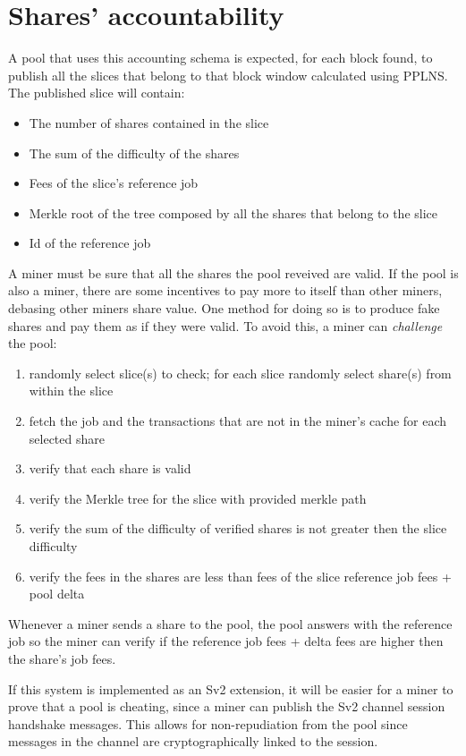 \documentclass[11pt]{article}
\begin{document}
\section{Shares' accountability}
A pool that uses this accounting schema is expected, for each block found, to publish all the slices
that belong to that block window calculated using PPLNS. The published slice will contain:
\begin{itemize}
	\item The number of shares contained in the slice
	\item The sum of the difficulty of the shares
	\item Fees of the slice's reference job
	\item Merkle root of the tree composed by all the shares that belong to the slice
	\item Id of the reference job
\end{itemize}
A miner must be sure that all the shares the pool reveived are valid. If the pool is also a miner, there are some incentives to pay more to itself than other miners, debasing other miners share value. One method for doing so is to produce fake shares and pay them as if they were valid. To avoid this, a miner can \emph{challenge} the pool:
\begin{enumerate}
	\item randomly select slice(s) to check; for each slice randomly select share(s) from within the slice
	\item fetch the job and the transactions that are not in the miner's cache for each selected share
	\item verify that each share is valid
	\item verify the Merkle tree for the slice with provided merkle path
	\item verify the sum of the difficulty of verified shares is not greater then the slice difficulty
	\item verify the fees in the shares are less than fees of the slice reference job fees + pool delta
\end{enumerate}

Whenever a miner sends a share to the pool, the pool answers with the reference job so the miner can verify if the reference job fees + delta fees are higher then the share's job fees.

If this system is implemented as an Sv2 extension, it will be easier for a miner to prove that a pool is cheating, since a miner can publish the Sv2 channel session handshake messages. This allows for non-repudiation from the pool since messages in the channel are cryptographically linked to the session.
\end{document}
